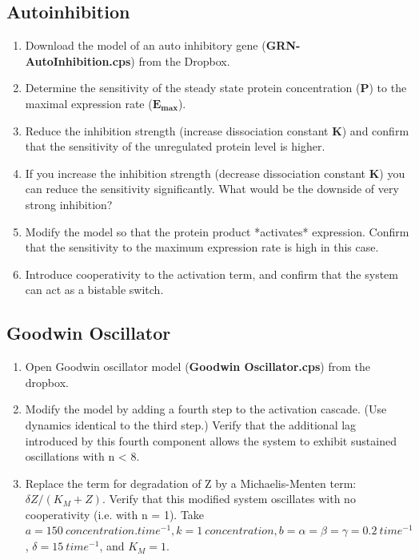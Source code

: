 \documentclass[10pt]{article}
\theoremstyle{definition}
\theoremstyle{remark}
\begin{document}
	\subsection*{Autoinhibition}
	\begin{enumerate}
		\item Download the model of an auto inhibitory gene (\textbf{GRN-AutoInhibition.cps}) from the Dropbox.
		
		\item Determine the sensitivity of the steady state protein concentration (\textbf{P}) to the maximal expression rate ({$\textbf{E}_{\textbf{max}}$}).
		
		\item Reduce the inhibition strength (increase dissociation constant $\textbf{K}$) and confirm that the sensitivity of the unregulated protein level is higher.
		
		\item If you increase the inhibition strength (decrease dissociation constant $\textbf{K}$) you can reduce the sensitivity significantly. What would be the downside of very strong inhibition?
		
		\item Modify the model so that the protein product *activates* expression. Confirm that the sensitivity to the maximum expression rate is high in this case. 

		\item Introduce cooperativity to the activation term, and confirm that the system can act as a bistable switch.
	\end{enumerate}
	
\subsection*{Goodwin Oscillator}
	\begin{enumerate}
		\item Open Goodwin oscillator model (\textbf{Goodwin Oscillator.cps}) from the dropbox.
		\item Modify the model by adding a fourth step to the activation cascade. (Use dynamics identical to the third step.) Verify that the additional lag introduced by this fourth component allows the system to exhibit sustained oscillations with n < 8.
		\item Replace the term for degradation of Z by a Michaelis-Menten term: $\delta Z/(K_M + Z)$. Verify that this modified system oscillates with no cooperativity (i.e. with n = 1). Take $a = 150\ concentration. time^{-1}, k = 1\ concentration,b = \alpha = \beta = \gamma= 0.2\  time^{-1}$ , $\delta = 15\ time^{-1}$, and $K_M = 1$.
	\end{enumerate}
	
\end{document}
